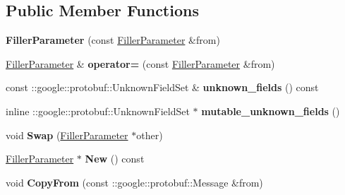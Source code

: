 \subsection*{Public Member Functions}
\begin{DoxyCompactItemize}
\item 
\mbox{\label{classcaffe_1_1_filler_parameter_af4c67d2b32cbd3167c4cd83f1a9de275}} 
{\bfseries Filler\+Parameter} (const \mbox{\hyperlink{classcaffe_1_1_filler_parameter}{Filler\+Parameter}} \&from)
\item 
\mbox{\label{classcaffe_1_1_filler_parameter_ab6f8287b296e074ed4a826c0527a7b39}} 
\mbox{\hyperlink{classcaffe_1_1_filler_parameter}{Filler\+Parameter}} \& {\bfseries operator=} (const \mbox{\hyperlink{classcaffe_1_1_filler_parameter}{Filler\+Parameter}} \&from)
\item 
\mbox{\label{classcaffe_1_1_filler_parameter_aa7111cb18c8170ecac2b675c6c6e65c9}} 
const \+::google\+::protobuf\+::\+Unknown\+Field\+Set \& {\bfseries unknown\+\_\+fields} () const
\item 
\mbox{\label{classcaffe_1_1_filler_parameter_ab62aca76c584ad7ad5eab0d33388f8ca}} 
inline \+::google\+::protobuf\+::\+Unknown\+Field\+Set $\ast$ {\bfseries mutable\+\_\+unknown\+\_\+fields} ()
\item 
\mbox{\label{classcaffe_1_1_filler_parameter_a1f941b614d2e35bad69813dceb22b901}} 
void {\bfseries Swap} (\mbox{\hyperlink{classcaffe_1_1_filler_parameter}{Filler\+Parameter}} $\ast$other)
\item 
\mbox{\label{classcaffe_1_1_filler_parameter_a9a138a6e04adbde620e9d10bbd34d0c4}} 
\mbox{\hyperlink{classcaffe_1_1_filler_parameter}{Filler\+Parameter}} $\ast$ {\bfseries New} () const
\item 
\mbox{\label{classcaffe_1_1_filler_parameter_acfaf62f0120b58bf81fe6cd10e0eccf3}} 
void {\bfseries Copy\+From} (const \+::google\+::protobuf\+::\+Message \&from)
\item 
\mbox{\label{classcaffe_1_1_filler_parameter_a22f77190c252f60f8465433f3a4913dc}} 

\end{DoxyCompactItemize}

